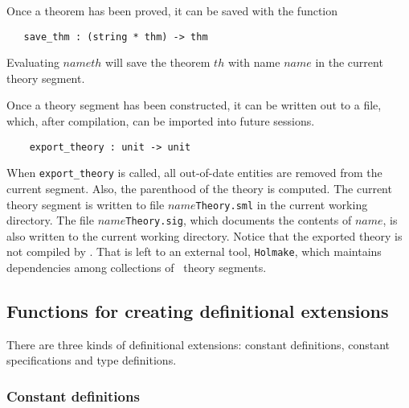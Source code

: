 Once a theorem has been proved, it can be saved with the function

\begin{boxed}
\begin{verbatim}
   save_thm : (string * thm) -> thm
\end{verbatim}\end{boxed}

\noindent Evaluating $name$$th$\ml{)} will save
the theorem $th$ with name $name$ in the current theory
segment.

Once a theory segment has been constructed, it can be written out to a
file, which, after compilation, can be imported into future sessions.

\begin{boxed}
\begin{verbatim}
    export_theory : unit -> unit
\end{verbatim}\end{boxed}

When {\small\verb+export_theory+} is called, all out-of-date entities
are removed from the current segment. Also, the parenthood of the theory
is computed. The current theory segment is written to file
$name${\small{\tt Theory.sml}} in the current working directory.  The
file $name${\small{\tt Theory.sig}}, which documents the contents of
$name$, is also written to the current working directory.  Notice that
the exported theory is not compiled by \HOL. That is left to an external
tool, {\small\verb+Holmake+}, which maintains dependencies among
collections of \HOL\ theory segments.

\subsection{Functions for creating definitional extensions}
\label{avra_definitional}

There are three kinds of definitional extensions:
constant definitions, constant specifications and type definitions.

\subsubsection{Constant definitions}

